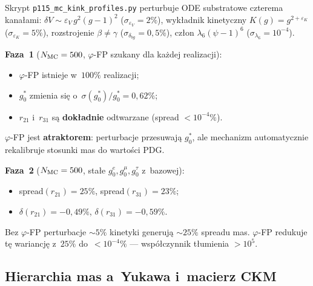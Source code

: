 \begin{proposition}%
\label{prop:phi-FP-robustness}
Skrypt \texttt{p115\_mc\_kink\_profiles.py} perturbuje ODE
substratowe czterema kana\l{}ami:
$\delta V \sim \varepsilon_V\,g^2(g-1)^2$
($\sigma_{\varepsilon_V} = 2\%$),
wyk\l{}adnik kinetyczny $K(g) = g^{2+\varepsilon_K}$
($\sigma_{\varepsilon_K} = 5\%$),
rozstrojenie $\beta \neq \gamma$
($\sigma_{\delta_{bg}} = 0{,}5\%$),
cz\l{}on $\lambda_6(\psi-1)^6$
($\sigma_{\lambda_6} = 10^{-4}$).

\textbf{Faza~1} ($N_{\rm MC} = 500$,
$\varphi$-FP szukany dla ka\.zdej realizacji):
\begin{itemize}[nosep]
  \item $\varphi$-FP istnieje w~$100\%$ realizacji;
  \item $g_0^*$ zmienia si\k{e} o~$\sigma(g_0^*)/g_0^* = 0{,}62\%$;
  \item $r_{21}$ i~$r_{31}$ s\k{a} \textbf{dok\l{}adnie} odtwarzane
        (spread $< 10^{-4}\%$).
\end{itemize}
$\varphi$-FP jest \textbf{atraktorem}: perturbacje przesuwaj\k{a} $g_0^*$,
ale mechanizm automatycznie rekalibruje stosunki mas do warto\'sci PDG.

\textbf{Faza~2} ($N_{\rm MC} = 500$, sta\l{}e $g_0^e, g_0^\mu, g_0^\tau$ z~bazowej):
\begin{itemize}[nosep]
  \item spread$(r_{21}) = 25\%$,\; spread$(r_{31}) = 23\%$;
  \item $\delta(r_{21}) = -0{,}49\%$,\; $\delta(r_{31}) = -0{,}59\%$.
\end{itemize}
Bez $\varphi$-FP perturbacje $\sim 5\%$ kinetyki generuj\k{a}
$\sim 25\%$ spreadu mas.
$\varphi$-FP redukuje t\k{e} wariancj\k{e}
z~$25\%$ do~$< 10^{-4}\%$ ---
wsp\'o\l{}czynnik t\l{}umienia $> 10^5$.
\end{proposition}

\subsection{Hierarchia mas a~Yukawa i~macierz CKM}%
\label{app:F-ckm}

